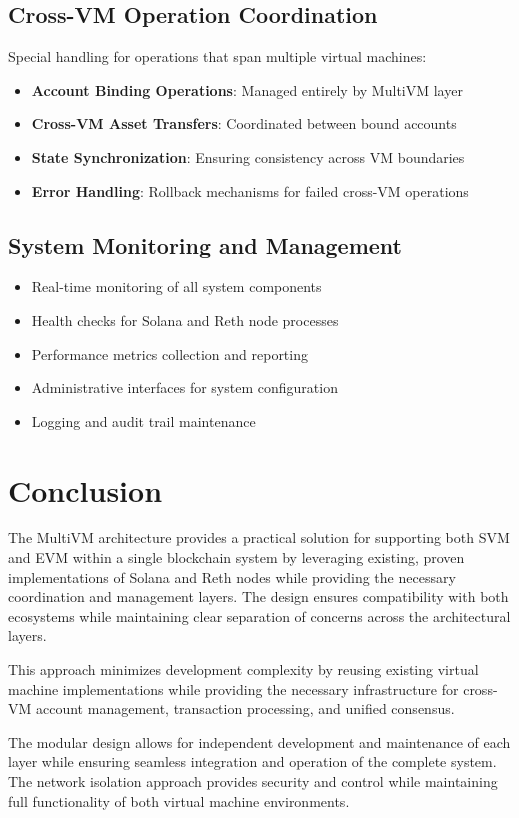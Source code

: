 \documentclass[11pt,a4paper]{article}
\begin{document}
\subsection{Cross-VM Operation Coordination}
Special handling for operations that span multiple virtual machines:

\begin{itemize}
    \item \textbf{Account Binding Operations}: Managed entirely by MultiVM layer
    \item \textbf{Cross-VM Asset Transfers}: Coordinated between bound accounts
    \item \textbf{State Synchronization}: Ensuring consistency across VM boundaries
    \item \textbf{Error Handling}: Rollback mechanisms for failed cross-VM operations
\end{itemize}

\subsection{System Monitoring and Management}
\begin{itemize}
    \item Real-time monitoring of all system components
    \item Health checks for Solana and Reth node processes
    \item Performance metrics collection and reporting
    \item Administrative interfaces for system configuration
    \item Logging and audit trail maintenance
\end{itemize}

\section{Conclusion}

The MultiVM architecture provides a practical solution for supporting both SVM and EVM within a single blockchain system by leveraging existing, proven implementations of Solana and Reth nodes while providing the necessary coordination and management layers. The design ensures compatibility with both ecosystems while maintaining clear separation of concerns across the architec\-tural layers.

This approach minimizes development complexity by reusing existing virtual machine implementations while providing the necessary infrastructure for cross-VM account management, transaction processing, and unified consensus.

The modular design allows for independent development and maintenance of each layer while ensuring seamless integration and operation of the complete system. The network isolation approach provides security and control while maintaining full functionality of both virtual machine environments.
\end{document}
